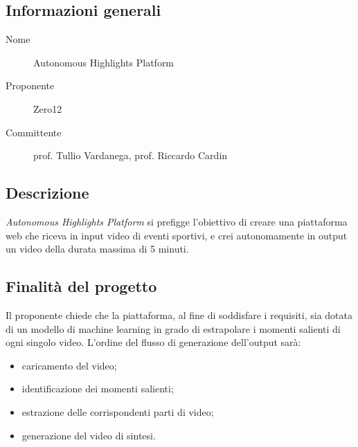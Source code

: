 \documentclass[../studio-di-fattibilita.tex]{subfiles}
\begin{document}
	\subsection{Informazioni generali}
	\label{subsec:informazioni_generali}
	\begin{description}
		\item[Nome] Autonomous Highlights Platform
		\item[Proponente] Zero12
		\item[Committente] prof. Tullio Vardanega, prof. Riccardo Cardin
	\end{description}


	\subsection{Descrizione}
	\label{subsec:Descrizione}
	\textit{Autonomous Highlights Platform} si prefigge l'obiettivo di creare una piattaforma web che riceva in input video di eventi sportivi, e crei autonomamente in output un video della durata massima di 5 minuti.

	
	\subsection{Finalità del progetto}
	\label{subsec:finalita_del_progetto}
	Il proponente chiede che la piattaforma, al fine di soddisfare i requisiti, sia dotata di un modello di machine learning in grado di estrapolare i momenti salienti di ogni singolo video. L'ordine del flusso di generazione dell'output sarà:
	\begin{itemize}
		\item caricamento del video;
		\item identificazione dei momenti salienti;
		\item estrazione delle corrispondenti parti di video;
		\item generazione del video di sintesi.
	\end{itemize}
\end{document}
